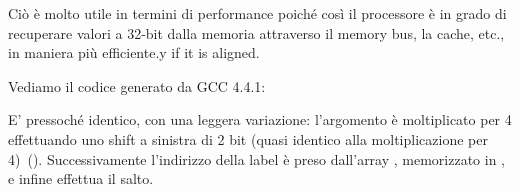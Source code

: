 Ciò è molto utile in termini di performance poiché così il processore è in grado di recuperare valori a 32-bit dalla memoria attraverso il memory bus, 
la cache, etc., in maniera più efficiente.y if it is aligned.



\label{switch_lot_GCC}

Vediamo il codice generato da GCC 4.4.1:




E' pressoché identico, con una leggera variazione: l'argomento  è moltiplicato per 4
effettuando uno shift a sinistra di 2 bit (quasi identico alla moltiplicazione per 4)~().
Successivamente l'indirizzo della label è preso dall'array , memorizzato in 
\EAX, e infine  effettua il salto.

